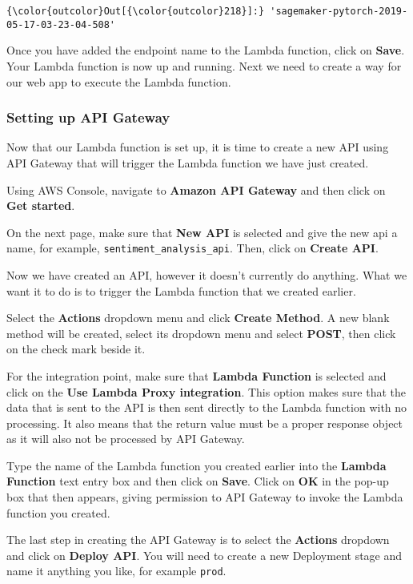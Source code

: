 \documentclass[11pt]{article}
\begin{document}
\begin{Verbatim}[commandchars=\\\{\}]
{\color{outcolor}Out[{\color{outcolor}218}]:} 'sagemaker-pytorch-2019-05-17-03-23-04-508'
\end{Verbatim}
            
    Once you have added the endpoint name to the Lambda function, click on
\textbf{Save}. Your Lambda function is now up and running. Next we need
to create a way for our web app to execute the Lambda function.

\hypertarget{setting-up-api-gateway}{%
\subsubsection{Setting up API Gateway}\label{setting-up-api-gateway}}

Now that our Lambda function is set up, it is time to create a new API
using API Gateway that will trigger the Lambda function we have just
created.

Using AWS Console, navigate to \textbf{Amazon API Gateway} and then
click on \textbf{Get started}.

On the next page, make sure that \textbf{New API} is selected and give
the new api a name, for example, \texttt{sentiment\_analysis\_api}.
Then, click on \textbf{Create API}.

Now we have created an API, however it doesn't currently do anything.
What we want it to do is to trigger the Lambda function that we created
earlier.

Select the \textbf{Actions} dropdown menu and click \textbf{Create
Method}. A new blank method will be created, select its dropdown menu
and select \textbf{POST}, then click on the check mark beside it.

For the integration point, make sure that \textbf{Lambda Function} is
selected and click on the \textbf{Use Lambda Proxy integration}. This
option makes sure that the data that is sent to the API is then sent
directly to the Lambda function with no processing. It also means that
the return value must be a proper response object as it will also not be
processed by API Gateway.

Type the name of the Lambda function you created earlier into the
\textbf{Lambda Function} text entry box and then click on \textbf{Save}.
Click on \textbf{OK} in the pop-up box that then appears, giving
permission to API Gateway to invoke the Lambda function you created.

The last step in creating the API Gateway is to select the
\textbf{Actions} dropdown and click on \textbf{Deploy API}. You will
need to create a new Deployment stage and name it anything you like, for
example \texttt{prod}.
\end{document}
